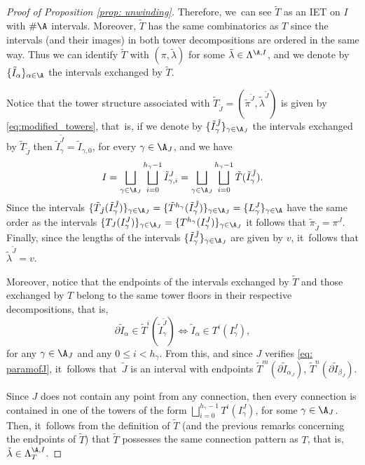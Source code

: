 \begin{proof}[Proof of Proposition \ref{prop: unwinding}]
Therefore, we~can see $\tilde T$ as an IET on $I$ with $\# \A$ intervals. Moreover, $\tilde T$ has the same combinatorics as $T$ since the intervals (and their images) in both tower decompositions are ordered in the same way. Thus we can identify $\tilde T$ with $(\pi, \tilde \lambda)$ for some $\tilde \lambda \in \Lambda^{\A, I}$, and we denote by $\{\tilde I_\alpha\}_{\alpha \in \A}$ the intervals exchanged by $\tilde T$.

Notice that the tower structure associated with $\tilde T_{\tilde J} = (\tilde \pi^{\tilde J}, \tilde \lambda^{\tilde J})$ is given by \eqref{eq:modified_towers}, that~is, if we denote by $\{\tilde I_\gamma^{\tilde J}\}_{\gamma \in \A_J}$ the intervals exchanged by $\tilde T_{\tilde J}$ then $ \tilde I_\gamma^{\tilde J} = \tilde I_{\gamma, 0}$, for every $\gamma \in \A_J$, and we have
\[
 I = \bigsqcup_{\gamma \in \A_J} \bigsqcup_{i = 0}^{h_\gamma - 1} \tilde I_{\gamma, i}^J = \bigsqcup_{\gamma \in \A_J} \bigsqcup_{i = 0}^{h_\gamma - 1} \tilde T(\tilde I_{\gamma}^{\tilde J}).
\]
Since the intervals $\{\tilde T_{\tilde J}(\tilde I_\gamma^{\tilde J})\}_{\gamma \in \A_J} = \{\tilde T^{h_\gamma}(\tilde I_\gamma^{\tilde J})\}_{\gamma \in \A_J} = \{L_\gamma^J\}_{\gamma \in \A}$ have the same order as the intervals $\{T_{J}(I_\gamma^J)\}_{\gamma \in \A_J} = \{T^{h_\gamma}(I_\gamma^J)\}_{\gamma \in \A_J}$ it follows that $\tilde \pi_{\tilde J} = \pi^J$. Finally, since the lengths of the intervals $\{\tilde I_\gamma^{\tilde J}\}_{\gamma \in \A_J}$ are given by $v$, it~follows that $\tilde \lambda^{\tilde J} = v$.

Moreover, notice that the endpoints of the intervals exchanged by $\tilde T$ and those exchanged by $T$ belong to the same tower floors in their respective decompositions, that is,
\[
 \partial \tilde I_\alpha \in \tilde{T}^i(\tilde I_\gamma^{\tilde J}) \iff \tilde I_\alpha \in T^i(I^J_\gamma),
\]
for any $\gamma \in \A_J$ and any $0 \leq i < h_\gamma$. From this, and since $J$ verifies \eqref{eq: paramofJ}, it~follows that~$\tilde J$ is an interval with endpoints $\tilde T^{m}(\partial \tilde I_{\alpha_J})$, $\tilde T^n(\partial \tilde I_{\beta_J})$.

Since $J$ does not contain any point from any connection, then every connection is contained in one of the towers of the form $\bigsqcup_{i=0}^{h_{\gamma}-1}T^i(I_{\gamma}^J)$, for some $\gamma \in \A_J$. Then, it~follows from the definition of $\tilde T$ (and the previous remarks concerning the endpoints of $\tilde T$) that $\tilde T$ possesses the same connection pattern as $T$, that is, $\tilde \lambda \in \Lambda_T^{\A, I}$.
\end{proof}

